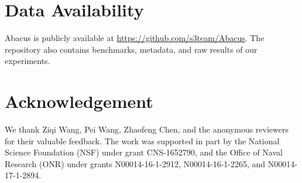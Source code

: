 \documentclass[10pt,conference]{IEEEtran}
\newcommand{\cready}[2]{{\color{red}{\ifx&#1&\else- #1\fi}} {\color{green}{\ifx&#2&\else+ #2\fi}}}%
\renewcommand{\cready}[2]{#2}%
\newcommand{\tool}{TANA}
\renewcommand{\tool}{CleverHans}
\renewcommand{\tool}{Cygne}
\renewcommand{\tool}{Do-Re-Mi}
\renewcommand{\tool}{Ta-fa Te-fe}
\renewcommand{\tool}{Ti-ri-ti-ri}
\renewcommand{\tool}{Du-Ta-De-Ta}
\renewcommand{\tool}{\textsf{Abacus}}
\begin{document}
\section{Data Availability}
\cready{}{\tool{} is publicly available at \url{https://github.com/s3team/Abacus}. The repository also contains benchmarks, metadata, and raw results of our experiments.}

\section{Acknowledgement}
We thank Ziqi Wang, Pei Wang, Zhaofeng Chen, and the anonymous reviewers for their valuable feedback. The work was supported in part by the National Science Foundation (NSF) under grant CNS-1652790, and the Office of Naval Research (ONR) under grants N00014-16-1-2912, N00014-16-1-2265, and N00014-17-1-2894. 





%
\end{document}
